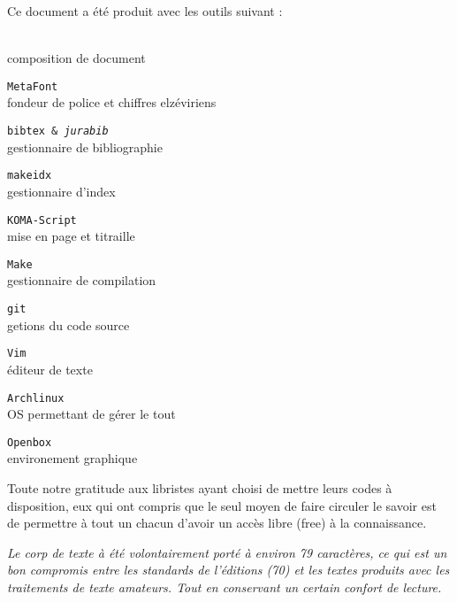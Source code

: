 
\newcommand\colophon[2]{\par\texttt{#1}\\ #2\medskip}

\cleardoublepage
\thispagestyle{empty}
\begin{center}
\small
Ce document a été produit avec les outils suivant :

\begin{multicols}{2}
\par\LaTeXe{}\\ composition de document\medskip
\colophon{MetaFont}{fondeur de police et chiffres elzéviriens}
\colophon{bibtex \& \emph{jurabib}}{gestionnaire de bibliographie}
\colophon{makeidx}{gestionnaire d'index}
\colophon{KOMA-Script}{mise en page et titraille}
\colophon{Make}{gestionnaire de compilation}
\colophon{git}{getions du code source}
\colophon{Vim}{éditeur de texte}
\colophon{Archlinux}{OS permettant de gérer le tout}
\colophon{Openbox}{environement graphique}
\end{multicols}

\bigskip

Toute notre gratitude aux libristes ayant choisi de mettre leurs codes à disposition,
eux qui ont compris que le seul moyen de faire circuler le savoir est de permettre
à tout un chacun d'avoir un accès libre (free) à la connaissance.

\bigskip\bigskip

\emph{%
Le corp de texte à été volontairement porté à environ 79 caractères,
	ce qui est un bon compromis entre les standards de l'éditions (70)
	et les textes produits avec les traitements de texte amateurs.
Tout en conservant un certain confort de lecture. 
}
\end{center}

